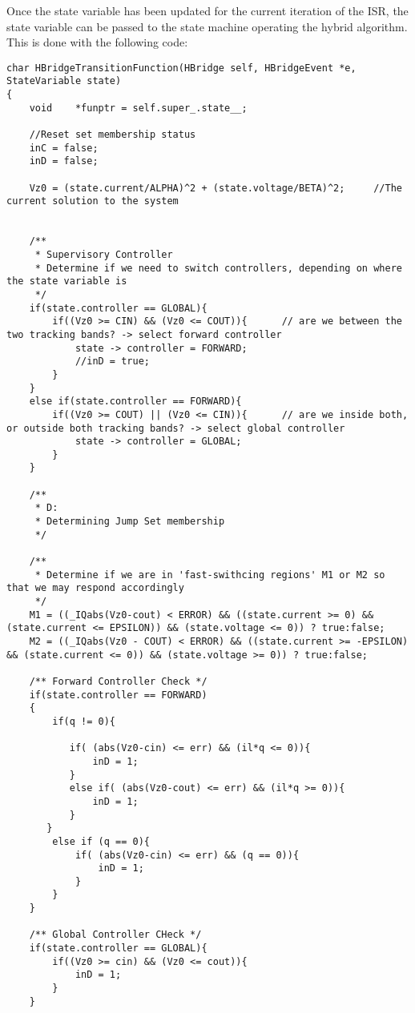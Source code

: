 Once the state variable has been updated for the current iteration of the ISR, the state variable can be passed to the state machine operating the hybrid algorithm. This is done with the following code:

\begin{lstlisting}
char HBridgeTransitionFunction(HBridge self, HBridgeEvent *e, StateVariable state)
{
    void    *funptr = self.super_.state__;    
    
    //Reset set membership status
    inC = false;   
    inD = false;

    Vz0 = (state.current/ALPHA)^2 + (state.voltage/BETA)^2;		//The current solution to the system


    /**
     * Supervisory Controller 
     * Determine if we need to switch controllers, depending on where the state variable is
     */
    if(state.controller == GLOBAL){
        if((Vz0 >= CIN) && (Vz0 <= COUT)){      // are we between the two tracking bands? -> select forward controller
            state -> controller = FORWARD;
            //inD = true;
        }
    }
    else if(state.controller == FORWARD){
        if((Vz0 >= COUT) || (Vz0 <= CIN)){      // are we inside both, or outside both tracking bands? -> select global controller
            state -> controller = GLOBAL;
        }
    }

    /**
     * D:
     * Determining Jump Set membership
     */
    
    /**
     * Determine if we are in 'fast-swithcing regions' M1 or M2 so that we may respond accordingly
     */
    M1 = ((_IQabs(Vz0-cout) < ERROR) && ((state.current >= 0) && (state.current <= EPSILON)) && (state.voltage <= 0)) ? true:false;
    M2 = ((_IQabs(Vz0 - COUT) < ERROR) && ((state.current >= -EPSILON) && (state.current <= 0)) && (state.voltage >= 0)) ? true:false;

    /** Forward Controller Check */
    if(state.controller == FORWARD)           
    {      
        if(q != 0){

           if( (abs(Vz0-cin) <= err) && (il*q <= 0)){
               inD = 1;
           }
           else if( (abs(Vz0-cout) <= err) && (il*q >= 0)){
               inD = 1;
           }
       }
        else if (q == 0){
            if( (abs(Vz0-cin) <= err) && (q == 0)){
                inD = 1;
            }
        }
    }

    /** Global Controller CHeck */
    if(state.controller == GLOBAL){
        if((Vz0 >= cin) && (Vz0 <= cout)){
            inD = 1;
        }
    }


\end{lstlisting}
